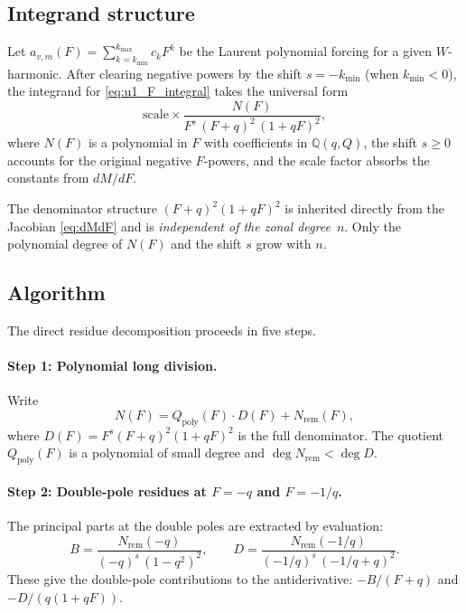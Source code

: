 \documentclass[11pt]{article}
\begin{document}
\subsection{Integrand structure}

Let $a_{v,m}(F) = \sum_{k=k_{\min}}^{k_{\max}} c_k F^k$ be the Laurent
polynomial forcing for a given $W$-harmonic. After clearing negative powers
by the shift $s = -k_{\min}$ (when $k_{\min} < 0$), the integrand for
\eqref{eq:u1_F_integral} takes the universal form
\begin{equation}
\text{scale} \times
\frac{N(F)}{F^s\,(F+q)^2\,(1+qF)^2},
\label{eq:integrand_universal}
\end{equation}
where $N(F)$ is a polynomial in $F$ with coefficients in $\mathbb{Q}(q, Q)$,
the shift $s \ge 0$ accounts for the original negative $F$-powers, and
the scale factor absorbs the constants from $dM/dF$.

The denominator structure $(F+q)^2(1+qF)^2$ is inherited directly from the
Jacobian \eqref{eq:dMdF} and is \emph{independent of the zonal degree}~$n$.
Only the polynomial degree of $N(F)$ and the shift $s$ grow with $n$.

\subsection{Algorithm}

The direct residue decomposition proceeds in five steps.

\paragraph{Step 1: Polynomial long division.}
Write
\begin{equation}
N(F) = Q_{\mathrm{poly}}(F) \cdot D(F) + N_{\mathrm{rem}}(F),
\end{equation}
where $D(F) = F^s (F+q)^2 (1+qF)^2$ is the full denominator. The quotient
$Q_{\mathrm{poly}}(F)$ is a polynomial of small degree and
$\deg N_{\mathrm{rem}} < \deg D$.

\paragraph{Step 2: Double-pole residues at $F = -q$ and $F = -1/q$.}
The principal parts at the double poles are extracted by evaluation:
\begin{equation}
B = \frac{N_{\mathrm{rem}}(-q)}{(-q)^s\,(1-q^2)^2},
\qquad
D = \frac{N_{\mathrm{rem}}(-1/q)}{(-1/q)^s\,\left(-1/q + q\right)^2}.
\label{eq:double_pole_residues}
\end{equation}
These give the double-pole contributions to the antiderivative:
$-B/(F+q)$ and $-D/(q(1+qF))$.
\end{document}
